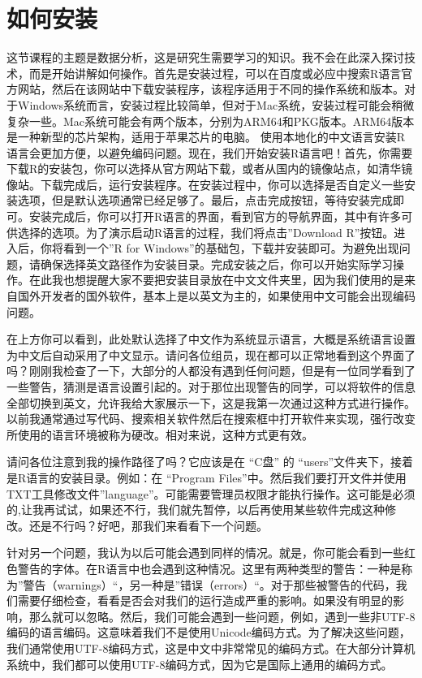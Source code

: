 \documentclass[
  oneside]{book}
\begin{document}
\hypertarget{2-install-R}{%
\section{如何安装}\label{2-install-R}}

这节课程的主题是数据分析，这是研究生需要学习的知识。我不会在此深入探讨技术，而是开始讲解如何操作。首先是安装过程，可以在百度或必应中搜索R语言官方网站，然后在该网站中下载安装程序，该程序适用于不同的操作系统和版本。对于Windows系统而言，安装过程比较简单，但对于Mac系统，安装过程可能会稍微复杂一些。Mac系统可能会有两个版本，分别为ARM64和PKG版本。ARM64版本是一种新型的芯片架构，适用于苹果芯片的电脑。
使用本地化的中文语言安装R语言会更加方便，以避免编码问题。现在，我们开始安装R语言吧！首先，你需要下载R的安装包，你可以选择从官方网站下载，或者从国内的镜像站点，如清华镜像站。下载完成后，运行安装程序。在安装过程中，你可以选择是否自定义一些安装选项，但是默认选项通常已经足够了。最后，点击完成按钮，等待安装完成即可。安装完成后，你可以打开R语言的界面，看到官方的导航界面，其中有许多可供选择的选项。为了演示启动R语言的过程，我们将点击''Download
R''按钮。进入后，你将看到一个''R for
Windows''的基础包，下载并安装即可。为避免出现问题，请确保选择英文路径作为安装目录。完成安装之后，你可以开始实际学习操作。在此我也想提醒大家不要把安装目录放在中文文件夹里，因为我们使用的是来自国外开发者的国外软件，基本上是以英文为主的，如果使用中文可能会出现编码问题。

在上方你可以看到，此处默认选择了中文作为系统显示语言，大概是系统语言设置为中文后自动采用了中文显示。请问各位组员，现在都可以正常地看到这个界面了吗？刚刚我检查了一下，大部分的人都没有遇到任何问题，但是有一位同学看到了一些警告，猜测是语言设置引起的。对于那位出现警告的同学，可以将软件的信息全部切换到英文，允许我给大家展示一下，这是我第一次通过这种方式进行操作。以前我通常通过写代码、搜索相关软件然后在搜索框中打开软件来实现，强行改变所使用的语言环境被称为硬改。相对来说，这种方式更有效。

请问各位注意到我的操作路径了吗？它应该是在 ``C盘'' 的
``users''文件夹下，接着是R语言的安装目录。例如：在 ``Program
Files''中。然后我们要打开文件并使用TXT工具修改文件''language''。可能需要管理员权限才能执行操作。这可能是必须的,让我再试试，如果还不行，我们就先暂停，以后再使用某些软件完成这种修改。还是不行吗？好吧，那我们来看看下一个问题。

针对另一个问题，我认为以后可能会遇到同样的情况。就是，你可能会看到一些红色警告的字体。在R语言中也会遇到这种情况。这里有两种类型的警告：一种是称为''警告（warnings）``，另一种是''错误（errors）``。对于那些被警告的代码，我们需要仔细检查，看看是否会对我们的运行造成严重的影响。如果没有明显的影响，那么就可以忽略。然后，我们可能会遇到一些问题，例如，遇到一些非UTF-8编码的语言编码。这意味着我们不是使用Unicode编码方式。为了解决这些问题，我们通常使用UTF-8编码方式，这是中文中非常常见的编码方式。在大部分计算机系统中，我们都可以使用UTF-8编码方式，因为它是国际上通用的编码方式。
\end{document}
